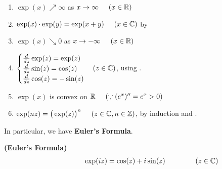 \documentclass{report}
\begin{document}
\begin{mdframed}
\begin{enumerate}[label=(\alph*)]
  \item $\exp(x)\nearrow \infty$ as $x\to \infty\hspace{0.5cm}(x\in\mathbb{R})$ 
  \item $\exp(x)\cdot \exp(y)=\exp(x+y)\hspace{0.5cm}(x\in\mathbb{C})$ by 
  \item $\exp (x)\searrow 0$ as $x \to -\infty\hspace{0.5cm}(x\in\mathbb{R})$
  \item $\begin{cases}
\frac{d}{dz}\exp(z)=\exp(z)\\
  \frac{d}{dz}\sin (z)=\cos (z)\\
  \frac{d}{dz}\cos (z)=- \sin (z)
  \end{cases}(z\in\mathbb{C})$, using . 
  \item $\exp (x)$ is convex on $\mathbb{R}\hspace{0.5cm}(\because (e^x)''=e^x>0)$  
  \item $\exp (nz)=\big(\exp (z) \big)^n\hspace{0.5cm}(z\in\mathbb{C},n\in\mathbb{Z})$, by induction and . 
\end{enumerate}
In particular, we have \textbf{Euler's Formula}. 
\end{mdframed}
\begin{theorem}
\textbf{(Euler's Formula)}  
\begin{align*}
\hspace{2cm}\exp(iz)=\cos (z) + i \sin (z)\hspace{1.5cm}(z\in\mathbb{C})
\end{align*}
\end{theorem}
\end{document}
